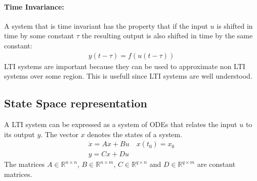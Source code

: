\paragraph{Time Invariance:}
A system that is time invariant has the property that if the input \(u\) is shifted in time by some constant \(\tau\) the resulting output is also shifted in time by the same constant:
\begin{gather}
y(t - \tau) = f(u(t-\tau))
\end{gather}
LTI systems are important because they can be used to approximate non LTI systems over some region.
This is usefull since LTI systems are well understood.
\cite{DouglasB}
\subsection{State Space representation}
A LTI system can be expressed as a system of ODEs that relates the input \(u\) to its output \(y\).
The vector \(x\) denotes the states of a system.
\begin{gather}
\dot{x} = Ax + Bu \quad x(t_0) = x_0\\
y = Cx + Du
\end{gather}
The matrices \(A \in \mathbb{R}^{n \times n}\),
\(B \in \mathbb{R}^{n \times m}\),
\(C \in \mathbb{R}^{q \times n}\) and
\(D \in \mathbb{R}^{q \times m}\) are constant matrices.
\cite{BennerGrivet}
